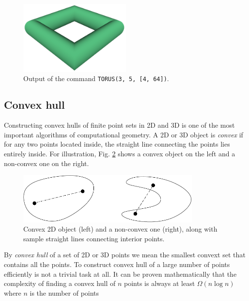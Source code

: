 \begin{figure}[!ht]
\begin{center}
\includegraphics[width=0.5\textwidth]{img/torus-5.png}
\end{center}
\vspace{-4mm}
\caption{Output of the command {\tt TORUS(3, 5, [4, 64])}.}
\label{fig:torus-5}
\end{figure}
\noindent

\subsection{Convex hull}

Constructing convex hulls of finite point sets in 2D and 3D is one of the 
most important algorithms of computational geometry. A 2D or 3D object is {\em convex} if for any 
two points located inside, the straight line connecting the points 
lies entirely inside. For illustration, Fig. \ref{fig:convex} 
shows a convex object on the left and a non-convex one on the right.

\begin{figure}[!ht]
\begin{center}
\includegraphics[width=0.82\textwidth]{img/convex.pdf}
\end{center}
\vspace{-4mm}
\caption{Convex 2D object (left) and a non-convex one (right), along with 
         sample straight lines connecting interior points.}
\label{fig:convex}
\end{figure}
\noindent
By {\em convex hull} of a set of 2D or 3D points we mean the smallest convext 
set that contains all the points. To construct convex hull of a large number 
of points efficiently is not a trivial task at all. It can be proven 
mathematically that the complexity of finding a convex hull of $n$ points 
is always at least $Ω(n \log n)$ where $n$ is the number of points 
 
